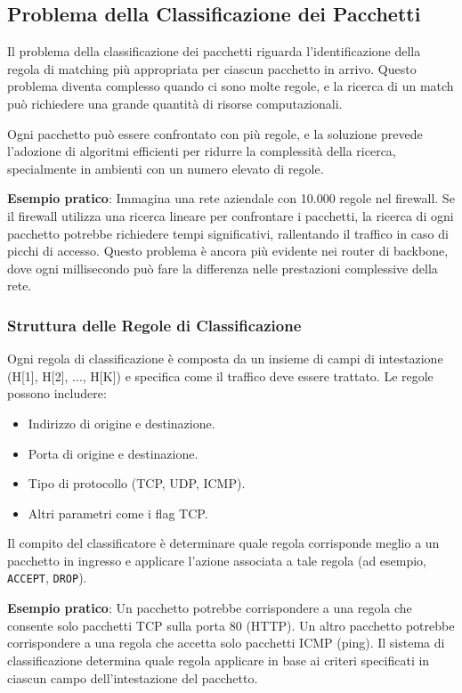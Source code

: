 \subsection{Problema della Classificazione dei Pacchetti}
Il problema della classificazione dei pacchetti riguarda l'identificazione della regola di matching più appropriata per ciascun pacchetto in arrivo. Questo problema diventa complesso quando ci sono molte regole, e la ricerca di un match può richiedere una grande quantità di risorse computazionali.

Ogni pacchetto può essere confrontato con più regole, e la soluzione prevede l'adozione di algoritmi efficienti per ridurre la complessità della ricerca, specialmente in ambienti con un numero elevato di regole.

\textbf{Esempio pratico}:
Immagina una rete aziendale con 10.000 regole nel firewall. Se il firewall utilizza una ricerca lineare per confrontare i pacchetti, la ricerca di ogni pacchetto potrebbe richiedere tempi significativi, rallentando il traffico in caso di picchi di accesso. Questo problema è ancora più evidente nei router di backbone, dove ogni millisecondo può fare la differenza nelle prestazioni complessive della rete.

\subsubsection{Struttura delle Regole di Classificazione}
Ogni regola di classificazione è composta da un insieme di campi di intestazione (H[1], H[2], ..., H[K]) e specifica come il traffico deve essere trattato. Le regole possono includere:
\begin{itemize}
  \item Indirizzo di origine e destinazione.
  \item Porta di origine e destinazione.
  \item Tipo di protocollo (TCP, UDP, ICMP).
  \item Altri parametri come i flag TCP.
\end{itemize}
Il compito del classificatore è determinare quale regola corrisponde meglio a un pacchetto in ingresso e applicare l'azione associata a tale regola (ad esempio, \texttt{ACCEPT}, \texttt{DROP}).

\textbf{Esempio pratico}:
Un pacchetto potrebbe corrispondere a una regola che consente solo pacchetti TCP sulla porta 80 (HTTP). Un altro pacchetto potrebbe corrispondere a una regola che accetta solo pacchetti ICMP (ping). Il sistema di classificazione determina quale regola applicare in base ai criteri specificati in ciascun campo dell'intestazione del pacchetto.

